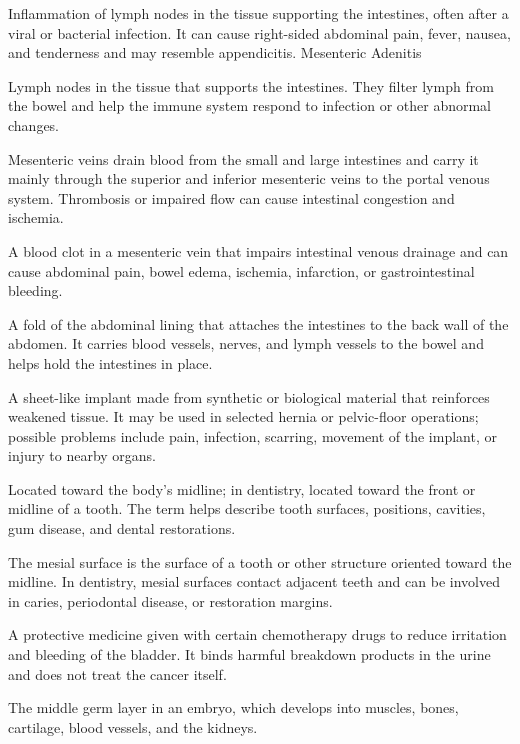  Inflammation of lymph nodes in the tissue supporting the intestines, often after a viral or bacterial infection. It can cause right-sided abdominal pain, fever, nausea, and tenderness and may resemble appendicitis.
\synonyms
Mesenteric Adenitis

 Lymph nodes in the tissue that supports the intestines. They filter lymph from the bowel and help the immune system respond to infection or other abnormal changes.

 Mesenteric veins drain blood from the small and large intestines and carry it mainly through the superior and inferior mesenteric veins to the portal venous system. Thrombosis or impaired flow can cause intestinal congestion and ischemia.

 A blood clot in a mesenteric vein that impairs intestinal venous drainage and can cause abdominal pain, bowel edema, ischemia, infarction, or gastrointestinal bleeding.

 A fold of the abdominal lining that attaches the intestines to the back wall of the abdomen. It carries blood vessels, nerves, and lymph vessels to the bowel and helps hold the intestines in place.

 A sheet-like implant made from synthetic or biological material that reinforces weakened tissue. It may be used in selected hernia or pelvic-floor operations; possible problems include pain, infection, scarring, movement of the implant, or injury to nearby organs.

 Located toward the body's midline; in dentistry, located toward the front or midline of a tooth. The term helps describe tooth surfaces, positions, cavities, gum disease, and dental restorations.

 The mesial surface is the surface of a tooth or other structure oriented toward the midline. In dentistry, mesial surfaces contact adjacent teeth and can be involved in caries, periodontal disease, or restoration margins.

 A protective medicine given with certain chemotherapy drugs to reduce irritation and bleeding of the bladder. It binds harmful breakdown products in the urine and does not treat the cancer itself.

 The middle germ layer in an embryo, which develops into muscles, bones, cartilage, blood
vessels, and the kidneys.

